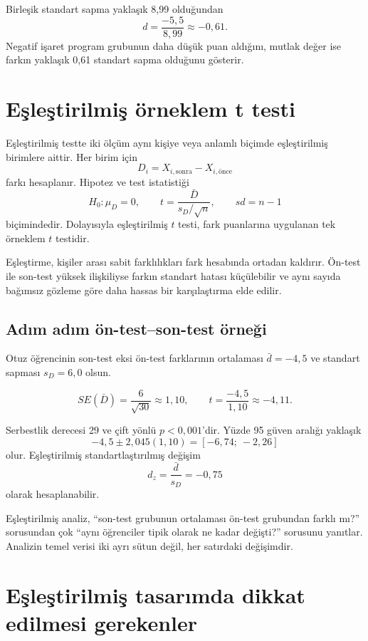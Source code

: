
Birleşik standart sapma yaklaşık 8,99 olduğundan
\[
d=\frac{-5{,}5}{8{,}99}\approx-0{,}61.
\]
Negatif işaret program grubunun daha düşük puan aldığını, mutlak değer ise
farkın yaklaşık 0,61 standart sapma olduğunu gösterir.

\section{Eşleştirilmiş örneklem t testi}

Eşleştirilmiş testte iki ölçüm aynı kişiye veya anlamlı biçimde eşleştirilmiş
birimlere aittir. Her birim için
\[
D_i=X_{i,\text{sonra}}-X_{i,\text{önce}}
\]
farkı hesaplanır. Hipotez ve test istatistiği
\[
H_0:\mu_D=0,
\qquad
t=\frac{\bar D}{s_D/\sqrt n},
\qquad sd=n-1
\]
biçimindedir. Dolayısıyla eşleştirilmiş $t$ testi, fark puanlarına uygulanan
tek örneklem $t$ testidir.

Eşleştirme, kişiler arası sabit farklılıkları fark hesabında ortadan kaldırır.
Ön-test ile son-test yüksek ilişkiliyse farkın standart hatası küçülebilir ve
aynı sayıda bağımsız gözleme göre daha hassas bir karşılaştırma elde edilir.

\subsection{Adım adım ön-test--son-test örneği}

Otuz öğrencinin son-test eksi ön-test farklarının ortalaması $\bar d=-4{,}5$
ve standart sapması $s_D=6{,}0$ olsun.

\[
SE(\bar D)=\frac{6}{\sqrt{30}}\approx1{,}10,
\qquad
t=\frac{-4{,}5}{1{,}10}\approx-4{,}11.
\]

Serbestlik derecesi 29 ve çift yönlü $p<0{,}001$'dir. Yüzde 95 güven aralığı
yaklaşık
\[
-4{,}5\pm2{,}045(1{,}10)
=[-6{,}74;\ -2{,}26]
\]
olur. Eşleştirilmiş standartlaştırılmış değişim
\[
d_z=\frac{\bar d}{s_D}=-0{,}75
\]
olarak hesaplanabilir.

\begin{sezgibox}
Eşleştirilmiş analiz, ``son-test grubunun ortalaması ön-test grubundan farklı
mı?'' sorusundan çok ``aynı öğrenciler tipik olarak ne kadar değişti?''
sorusunu yanıtlar. Analizin temel verisi iki ayrı sütun değil, her satırdaki
değişimdir.
\end{sezgibox}

\section{Eşleştirilmiş tasarımda dikkat edilmesi gerekenler}

